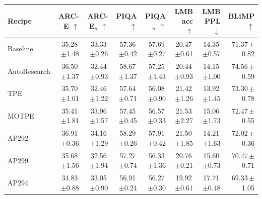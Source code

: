 \begin{tabular}{lrrrrrrr}
\toprule
Recipe & ARC-E $\uparrow$ & ARC-E$_n$ $\uparrow$ & PIQA $\uparrow$ & PIQA$_n$ $\uparrow$ & LMB acc $\uparrow$ & LMB PPL $\downarrow$ & BLiMP $\uparrow$ \\
\midrule
Baseline & 35.28\,\tiny$\pm$1.48 & 33.33\,\tiny$\pm$0.26 & 57.36\,\tiny$\pm$0.42 & 57.69\,\tiny$\pm$0.27 & 20.47\,\tiny$\pm$0.61 & 14.35\,\tiny$\pm$0.57 & 71.37\,\tiny$\pm$0.82 \\
AutoResearch & 36.50\,\tiny$\pm$1.37 & 32.44\,\tiny$\pm$0.93 & 58.67\,\tiny$\pm$1.37 & 57.25\,\tiny$\pm$1.43 & 20.44\,\tiny$\pm$0.93 & 14.15\,\tiny$\pm$1.00 & 74.56\,\tiny$\pm$0.59 \\
TPE & 35.70\,\tiny$\pm$1.01 & 32.46\,\tiny$\pm$1.22 & 57.64\,\tiny$\pm$0.71 & 56.08\,\tiny$\pm$0.90 & 21.42\,\tiny$\pm$1.26 & 13.92\,\tiny$\pm$1.45 & 73.30\,\tiny$\pm$0.78 \\
MOTPE & 35.41\,\tiny$\pm$1.81 & 33.96\,\tiny$\pm$1.57 & 57.45\,\tiny$\pm$0.45 & 56.57\,\tiny$\pm$0.33 & 21.53\,\tiny$\pm$2.27 & 15.06\,\tiny$\pm$1.73 & 72.47\,\tiny$\pm$0.55 \\
AP292 & 36.91\,\tiny$\pm$0.36 & 34.16\,\tiny$\pm$1.29 & 58.29\,\tiny$\pm$0.26 & 57.91\,\tiny$\pm$0.42 & 21.50\,\tiny$\pm$1.85 & 14.21\,\tiny$\pm$1.63 & 72.02\,\tiny$\pm$0.36 \\
AP299 & 35.68\,\tiny$\pm$1.56 & 32.56\,\tiny$\pm$1.94 & 57.27\,\tiny$\pm$0.74 & 56.33\,\tiny$\pm$1.36 & 20.76\,\tiny$\pm$0.21 & 15.60\,\tiny$\pm$0.73 & 70.47\,\tiny$\pm$0.71 \\
AP294 & 34.83\,\tiny$\pm$0.88 & 33.05\,\tiny$\pm$0.90 & 56.91\,\tiny$\pm$0.24 & 56.27\,\tiny$\pm$0.30 & 19.92\,\tiny$\pm$0.61 & 17.71\,\tiny$\pm$0.48 & 69.33\,\tiny$\pm$1.05 \\
\bottomrule
\end{tabular}
